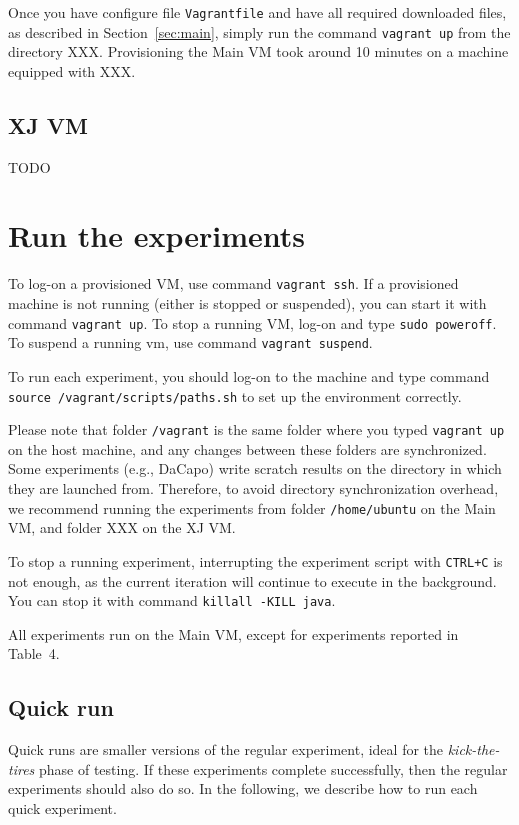 \documentclass[12pt]{article}
\begin{document}
Once you have configure file \texttt{Vagrantfile} and have all required
downloaded files, as described in Section~\ref{sec:main}, simply run the command
\texttt{vagrant up} from the directory XXX.  Provisioning the Main VM took around 10
minutes on a machine equipped with XXX.

\subsection{XJ VM}

TODO

\section{Run the experiments}

To log-on a provisioned VM, use command \texttt{vagrant ssh}.  If a provisioned
machine is not running (either is stopped or suspended), you can start it with
command \texttt{vagrant up}.  To stop a running VM, log-on and type \texttt{sudo
poweroff}.  To suspend a running vm, use command \texttt{vagrant suspend}.

To run each experiment, you should log-on to the machine and type command
\texttt{source /vagrant/scripts/paths.sh} to set up the environment correctly.

Please note that folder \texttt{/vagrant} is the same folder where you typed
\texttt{vagrant up} on the host machine, and any changes between these folders
are synchronized.  Some experiments (e.g., DaCapo) write scratch results on the
directory in which they are launched from.  Therefore, to avoid directory
synchronization overhead, we recommend running the experiments from folder
\texttt{/home/ubuntu} on the Main VM, and folder XXX on the XJ VM.

To stop a running experiment, interrupting the experiment script with
\texttt{CTRL+C} is not enough, as the current iteration will continue to execute
in the background.  You can stop it with command \texttt{killall -KILL java}.

All experiments run on the Main VM, except for experiments reported in Table~4.

\subsection{Quick run}

Quick runs are smaller versions of the regular experiment, ideal for the
\emph{kick-the-tires} phase of testing.  If these experiments complete
successfully, then the regular experiments should also do so.  In the following,
we describe how to run each quick experiment.
\end{document}
